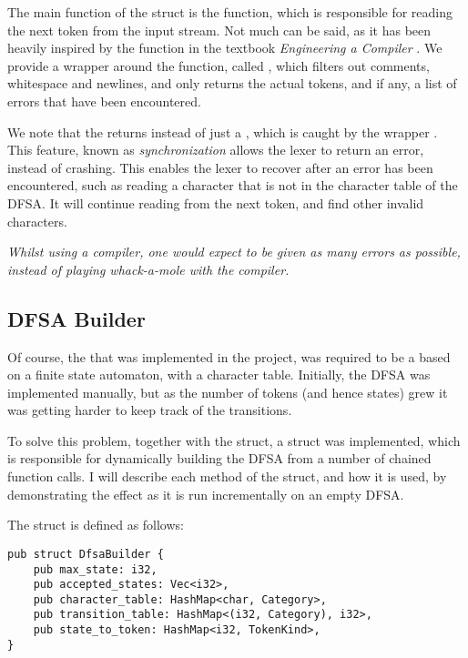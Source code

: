 The main function of the  struct is the  function,
which is responsible for reading the next token from the input stream. Not much
can be said, as it has been heavily inspired by the  function
in the textbook \textit{Engineering a Compiler} \cite{engineering-a-compiler}.
We provide a wrapper around the  function, called
, which filters out comments, whitespace and newlines, and only
returns the actual tokens, and if any, a list of errors that have been
encountered.


We note that the  returns 
instead of just a , which is caught by the wrapper .
This feature, known as \textit{synchronization} allows the lexer to return an
error, instead of crashing. This enables the lexer to recover after an error has
been encountered, such as reading a character that is not in the character table
of the DFSA. It will continue reading from the next token, and find other
invalid characters.

\begin{center}
    \textit{Whilst using a compiler, one would expect to
        be given as many errors as possible, instead of
        playing whack-a-mole with the compiler.}
\end{center}

\newpage

\subsection{DFSA Builder}

Of course, the  that was implemented in the project, was required to
be a based on a finite state automaton, with a character table. Initially, the
DFSA was implemented manually, but as the number of tokens (and hence states)
grew it was getting harder to keep track of the transitions.

To solve this problem, together with the  struct, a
 struct was implemented, which is responsible for dynamically
building the DFSA from a number of chained function calls. I will describe each
method of the  struct, and how it is used, by demonstrating
the effect as it is run incrementally on an empty DFSA.


The  struct is defined as follows:

\begin{mainbox}{}
    \lstset{xleftmargin=0cm}
    \begin{lstlisting}
pub struct DfsaBuilder {
    pub max_state: i32,
    pub accepted_states: Vec<i32>,
    pub character_table: HashMap<char, Category>,
    pub transition_table: HashMap<(i32, Category), i32>,
    pub state_to_token: HashMap<i32, TokenKind>,
}
    \end{lstlisting}
\end{mainbox}

